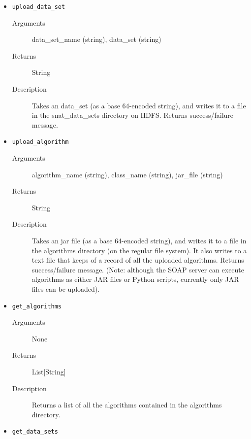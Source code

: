 \begin{itemize}
    \item {\tt upload\_data\_set}

    \begin{description}        
        \item[Arguments] data\_set\_name (string), data\_set (string)
        
        \item[Returns] String
        
        \item[Description] Takes an data\_set (as a base 64-encoded string), and
writes it to a file in the snat\_data\_sets directory on HDFS. Returns
success/failure message.
    \end{description}
    
    \item {\tt upload\_algorithm}

    \begin{description}        
        \item[Arguments] algorithm\_name (string), class\_name (string),
jar\_file (string)
        
        \item[Returns] String
        
        \item[Description] Takes an jar file (as a base 64-encoded string), and
writes it to a file in the algorithms directory (on the regular file system). It
also writes to a text file that keeps of a record of all the uploaded
algorithms. Returns success/failure message. (Note: although the SOAP server can
execute algorithms as either JAR files or Python scripts, currently only JAR
files can be uploaded).
    \end{description}
    
    \item {\tt get\_algorithms}

    \begin{description}        
        \item[Arguments] None
        
        \item[Returns] List[String]
        
        \item[Description] Returns a list of all the algorithms contained in the
algorithms directory.
    \end{description}
    
    \item {\tt get\_data\_sets}


\end{itemize}
